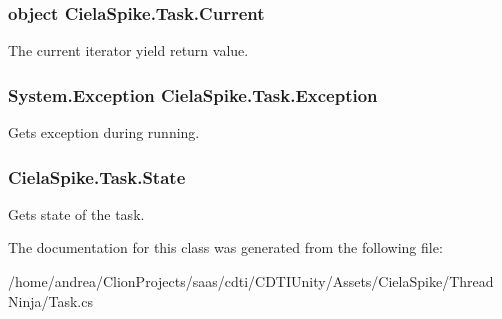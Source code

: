 \subsubsection[{\texorpdfstring{Current}{Current}}]{\setlength{\rightskip}{0pt plus 5cm}object Ciela\+Spike.\+Task.\+Current\hspace{0.3cm}{\ttfamily [get]}}\hypertarget{class_ciela_spike_1_1_task_a1b998f7aa927571627df0e146693c5a4}{}\label{class_ciela_spike_1_1_task_a1b998f7aa927571627df0e146693c5a4}


The current iterator yield return value. 

\subsubsection[{\texorpdfstring{Exception}{Exception}}]{\setlength{\rightskip}{0pt plus 5cm}System.\+Exception Ciela\+Spike.\+Task.\+Exception\hspace{0.3cm}{\ttfamily [get]}}\hypertarget{class_ciela_spike_1_1_task_a16f755d6c2d90b3d528aebc7526a0a2b}{}\label{class_ciela_spike_1_1_task_a16f755d6c2d90b3d528aebc7526a0a2b}


Gets exception during running. 

\subsubsection[{\texorpdfstring{State}{State}}]{ Ciela\+Spike.\+Task.\+State\hspace{0.3cm}{\ttfamily [get]}}\hypertarget{class_ciela_spike_1_1_task_a0b9fb190966ab28515afb40541ba23cf}{}\label{class_ciela_spike_1_1_task_a0b9fb190966ab28515afb40541ba23cf}


Gets state of the task. 



The documentation for this class was generated from the following file\+:\begin{DoxyCompactItemize}
\item 
/home/andrea/\+Clion\+Projects/saas/cdti/\+C\+D\+T\+I\+Unity/\+Assets/\+Ciela\+Spike/\+Thread Ninja/Task.\+cs\end{DoxyCompactItemize}
